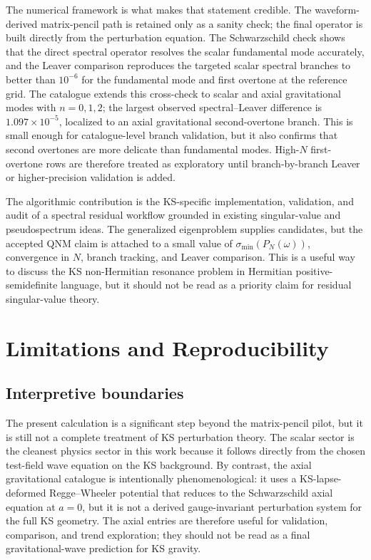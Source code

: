 \documentclass[10pt,letterpaper,twocolumn]{article}
\begin{document}
The numerical framework is what makes that statement credible. The waveform-derived matrix-pencil path is retained only as a sanity check; the final operator is built directly from the perturbation equation. The Schwarzschild check shows that the direct spectral operator resolves the scalar fundamental mode accurately, and the Leaver comparison reproduces the targeted scalar spectral branches to better than \(10^{-6}\) for the fundamental mode and first overtone at the reference grid. The catalogue extends this cross-check to scalar and axial gravitational modes with \(n=0,1,2\); the largest observed spectral--Leaver difference is \(1.097\times10^{-5}\), localized to an axial gravitational second-overtone branch. This is small enough for catalogue-level branch validation, but it also confirms that second overtones are more delicate than fundamental modes. High-\(N\) first-overtone rows are therefore treated as exploratory until branch-by-branch Leaver or higher-precision validation is added.

The algorithmic contribution is the KS-specific implementation, validation, and audit of a spectral residual workflow grounded in existing singular-value and pseudospectrum ideas. The generalized eigenproblem supplies candidates, but the accepted QNM claim is attached to a small value of \(\sigma_{\min}(P_N(\omega))\), convergence in \(N\), branch tracking, and Leaver comparison. This is a useful way to discuss the KS non-Hermitian resonance problem in Hermitian positive-semidefinite language, but it should not be read as a priority claim for residual singular-value theory.

\section{Limitations and Reproducibility}

\subsection{Interpretive boundaries}

The present calculation is a significant step beyond the matrix-pencil pilot, but it is still not a complete treatment of KS perturbation theory. The scalar sector is the cleanest physics sector in this work because it follows directly from the chosen test-field wave equation on the KS background. By contrast, the axial gravitational catalogue is intentionally phenomenological: it uses a KS-lapse-deformed Regge--Wheeler potential that reduces to the Schwarzschild axial equation at \(a=0\), but it is not a derived gauge-invariant perturbation system for the full KS geometry. The axial entries are therefore useful for validation, comparison, and trend exploration; they should not be read as a final gravitational-wave prediction for KS gravity.
\end{document}

